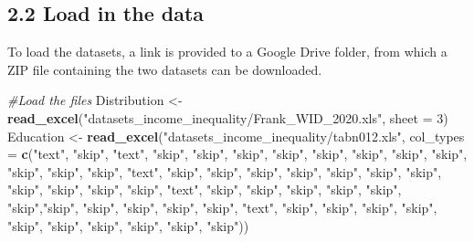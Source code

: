 \documentclass[
]{article}
\newenvironment{Shaded}{\begin{snugshade}}{\end{snugshade}}
\newcommand{\AttributeTok}[1]{\textcolor[rgb]{0.13,0.29,0.53}{#1}}
\newcommand{\CommentTok}[1]{\textcolor[rgb]{0.56,0.35,0.01}{\textit{#1}}}
\newcommand{\DecValTok}[1]{\textcolor[rgb]{0.00,0.00,0.81}{#1}}
\newcommand{\FunctionTok}[1]{\textcolor[rgb]{0.13,0.29,0.53}{\textbf{#1}}}
\newcommand{\NormalTok}[1]{#1}
\newcommand{\OtherTok}[1]{\textcolor[rgb]{0.56,0.35,0.01}{#1}}
\newcommand{\StringTok}[1]{\textcolor[rgb]{0.31,0.60,0.02}{#1}}
\begin{document}
\subsection{2.2 Load in the data}\label{load-in-the-data}

To load the datasets, a link is provided to a Google Drive folder, from
which a ZIP file containing the two datasets can be downloaded.

\begin{Shaded}
\begin{Highlighting}[]
\CommentTok{\#Load the files}
\NormalTok{Distribution }\OtherTok{\textless{}{-}} \FunctionTok{read\_excel}\NormalTok{(}\StringTok{"datasets\_income\_inequality/Frank\_WID\_2020.xls"}\NormalTok{, }\AttributeTok{sheet =} \DecValTok{3}\NormalTok{)}
\NormalTok{Education }\OtherTok{\textless{}{-}} \FunctionTok{read\_excel}\NormalTok{(}\StringTok{"datasets\_income\_inequality/tabn012.xls"}\NormalTok{, }\AttributeTok{col\_types =} \FunctionTok{c}\NormalTok{(}\StringTok{"text"}\NormalTok{, }\StringTok{"skip"}\NormalTok{, }\StringTok{"text"}\NormalTok{, }\StringTok{"skip"}\NormalTok{, }\StringTok{"skip"}\NormalTok{, }\StringTok{"skip"}\NormalTok{, }\StringTok{"skip"}\NormalTok{, }\StringTok{"skip"}\NormalTok{, }\StringTok{"skip"}\NormalTok{, }\StringTok{"skip"}\NormalTok{, }\StringTok{"skip"}\NormalTok{, }\StringTok{"skip"}\NormalTok{, }\StringTok{"skip"}\NormalTok{, }\StringTok{"skip"}\NormalTok{, }\StringTok{"text"}\NormalTok{, }\StringTok{"skip"}\NormalTok{, }\StringTok{"skip"}\NormalTok{, }\StringTok{"skip"}\NormalTok{, }\StringTok{"skip"}\NormalTok{, }\StringTok{"skip"}\NormalTok{, }\StringTok{"skip"}\NormalTok{, }\StringTok{"skip"}\NormalTok{, }\StringTok{"skip"}\NormalTok{, }\StringTok{"skip"}\NormalTok{, }\StringTok{"skip"}\NormalTok{, }\StringTok{"skip"}\NormalTok{, }\StringTok{"text"}\NormalTok{, }\StringTok{"skip"}\NormalTok{, }\StringTok{"skip"}\NormalTok{, }\StringTok{"skip"}\NormalTok{, }\StringTok{"skip"}\NormalTok{, }\StringTok{"skip"}\NormalTok{, }\StringTok{"skip"}\NormalTok{,}\StringTok{"skip"}\NormalTok{, }\StringTok{"skip"}\NormalTok{, }\StringTok{"skip"}\NormalTok{, }\StringTok{"skip"}\NormalTok{, }\StringTok{"skip"}\NormalTok{, }\StringTok{"text"}\NormalTok{, }\StringTok{"skip"}\NormalTok{, }\StringTok{"skip"}\NormalTok{, }\StringTok{"skip"}\NormalTok{, }\StringTok{"skip"}\NormalTok{, }\StringTok{"skip"}\NormalTok{, }\StringTok{"skip"}\NormalTok{, }\StringTok{"skip"}\NormalTok{, }\StringTok{"skip"}\NormalTok{, }\StringTok{"skip"}\NormalTok{, }\StringTok{"skip"}\NormalTok{))}
\end{Highlighting}
\end{Shaded}
\end{document}
